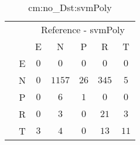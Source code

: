 \begin{table}[!ht]
	\centering
	\begin{tabular}{|c|c|c|c|c|c|c|}
		\cline{3-7}
		\multicolumn{2}{c|}{} & \multicolumn{5}{|c|}{Reference - svmPoly} \\ \cline{3-7}
		\multicolumn{2}{c|}{} & E & N & P & R & T \\ \hline
		\multirow{5}{*}{\rotatebox{90}{Prediction}} & E & $0$ & $0$ & $0$ & $0$ & $0$ \\ \cline{2-7}
		 & N & $0$ & $1157$ & $26$ & $345$ & $5$ \\ \cline{2-7}
		 & P & $0$ & $6$ & $1$ & $0$ & $0$ \\ \cline{2-7}
		 & R & $0$ & $3$ & $0$ & $21$ & $3$ \\ \cline{2-7}
		 & T & $3$ & $4$ & $0$ & $13$ & $11$ \\ \hline
	\end{tabular}
	\caption{cm:no_Dst:svmPoly}
	\label{tab:cm:no_Dst:svmPoly}
\end{table}

